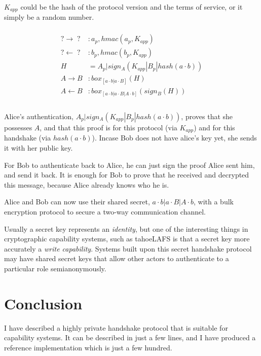 \documentclass[12pt]{article}
\begin{document}
$K_{app}$ could be the hash of the protocol version and the terms of service,
or it simply be a random number.

$$
\begin{align*}
\\
    ? \to \;?\;   &: a_p, hmac(a_p, K_{app})   \\
    ? \gets \;?\; &: b_p, hmac(b_p, K_{app}) \\
    H&=A_{p}|sign_A(K_{app}|B_p|hash(a\cdot b)) \\
    A \to B       &: box_{[a \cdot b | a \cdot B]}(H)\\
    A \gets B     &:
      box_{[a \cdot b | a \cdot B | A \cdot b]}(sign_B(H) )\\
\\
\end{align*}
$$

Alice's authentication, $A_{p}|sign_A(K_{app}|B_p|hash(a\cdot b))$,
proves that she possesses $A$, and that this proof is for this protocol
(via $K_{app}$) and for this handshake (via $hash(a\cdot b)$).
Incase Bob does not have alice's key yet, she sends it with her public key.

For Bob to authenticate back to Alice, he can just sign the proof
Alice sent him, and send it back. It is enough for Bob to prove
that he received and decrypted this message, because Alice already
knows who he is.

Alice and Bob can now use their shared secret,
$a \cdot b|a \cdot B|A \cdot b$, with a bulk encryption protocol
to secure a two-way communication channel.

Usually a secret key represents an \emph{identity}, but one of the
interesting things in cryptographic capability systems, such as tahoeLAFS
is that a secret key more accurately a \emph{write capability}.
Systems built upon this secret handshake protocol may have shared
secret keys that allow other actors to authenticate to a particular
role semianonymously.

\section{Conclusion}

I have described a highly private handshake protocol that is suitable
for capability systems. It can be described in just a few lines,
and I have produced a reference implementation which is just a few hundred.





\end{document}

